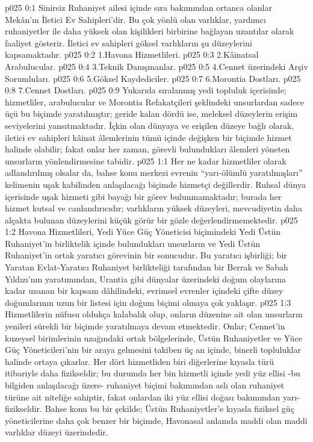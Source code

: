 \vs p025 0:1 Sinirsiz Ruhaniyet ailesi içinde sıra bakımından ortanca olanlar Mekân’ın İletici Ev Sahipleri’dir. Bu çok yönlü olan varlıklar, yardımcı ruhaniyetler ile daha yüksek olan kişilikleri birbirine bağlayan uzantılar olarak faaliyet gösterir. İletici ev sahipleri göksel varlıkların şu düzeylerini kapsamaktadır.
\vs p025 0:2 1.\bibnobreakspace Havona Hizmetlileri.
\vs p025 0:3 2.\bibnobreakspace Kâinatsal Arabulucular.
\vs p025 0:4 3.\bibnobreakspace Teknik Danışmanlar.
\vs p025 0:5 4.\bibnobreakspace Cennet üzerindeki Arşiv Sorumluları.
\vs p025 0:6 5.\bibnobreakspace Göksel Kaydediciler.
\vs p025 0:7 6.\bibnobreakspace Morontia Dostları.
\vs p025 0:8 7.\bibnobreakspace Cennet Dostları.
\vs p025 0:9 Yukarıda sıralanmış yedi topluluk içerisinde; hizmetliler, arabulucular ve Morontia Refakatçileri şeklindeki unsurlardan sadece üçü bu biçimde yaratılmıştır; geride kalan dördü ise, meleksel düzeylerin erişim seviyelerini yansıtmaktadır. İçkin olan dünyaya ve erişilen düzeye bağlı olarak, iletici ev sahipleri kâinat âlemlerinin tümü içinde değişken bir biçimde hizmet halinde olabilir; fakat onlar her zaman, görevli bulundukları âlemleri yöneten unsurların yönlendirmesine tabidir.
\vs p025 1:1 Her ne kadar hizmetliler olarak adlandırılmış olsalar da, bahse konu merkezi evrenin “yarı\hyp{}ölümlü yaratılmışları” kelimenin uşak kabilinden anlaşılacağı biçimde hizmetçi değillerdir. Ruhsal dünya içerisinde uşak hizmeti gibi bayağı bir görev bulunmamaktadır; burada her hizmet kutsal ve canlandırıcıdır; varlıkların yüksek düzeyleri, mevcudiyetin daha alçakta bulunan düzeylerini küçük görür bir gözle değerlendirmemektedir.
\vs p025 1:2 Havona Hizmetlileri, Yedi Yüce Güç Yöneticisi biçimindeki Yedi Üstün Ruhaniyet’in birliktelik içinde bulundukları unsurların ve Yedi Üstün Ruhaniyet’in ortak yaratıcı görevinin bir sonucudur. Bu yaratıcı işbirliği; bir Yaratan Evlat\hyp{}Yaratıcı Ruhaniyet birlikteliği tarafından bir Berrak ve Sabah Yıldızı’nın yaratımından, Urantia gibi dünyalar üzerindeki doğum olaylarına kadar uzanan bir kapsam dâhilindeki, evrimsel evrenler içindeki çifte düzey doğumlarının uzun bir listesi için doğum biçimi olmaya çok yaklaşır.
\vs p025 1:3 Hizmetlilerin nüfusu oldukça kalabalık olup, onların düzenine ait olan unsurların yenileri sürekli bir biçimde yaratılmaya devam etmektedir. Onlar; Cennet’in kuzeysel birimlerinin uzağındaki ortak bölgelerinde, Üstün Ruhaniyetler ve Yüce Güç Yöneticileri’nin bir araya gelmesini takiben üç an içinde, binerli topluluklar halinde ortaya çıkarlar. Her dört hizmetliden biri diğerlerine kıyasla türü itibariyle daha fizikseldir; bu durumda her bin hizmetli içinde yedi yüz ellisi \hyp{}bu bilgiden anlaşılacağı üzere\hyp{} ruhaniyet biçimi bakımından aslı olan ruhaniyet türüne ait niteliğe sahiptir, fakat onlardan iki yüz ellisi doğası bakımından yarı\hyp{}fizikseldir. Bahse konu bu  bir şekilde; Üstün Ruhaniyetler’e kıyasla fiziksel güç yöneticilerine daha çok benzer bir biçimde, Havonasal anlamda maddi olan maddi varlıklar düzeyi üzerindedir.

